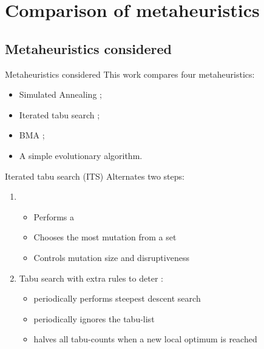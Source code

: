 \section{Comparison of metaheuristics} {
    \subsection{Metaheuristics considered} {
        \begin{frame}{Metaheuristics considered}
            This work compares four metaheuristics:
            \begin{itemize}
                \item Simulated Annealing \citep{kirkpatrick:1983op, vcerny:1985th};
                \item Iterated tabu search \citep{Misevicius:2012dj};
                \item BMA \citep{Benlic:2015gp};
                \item A simple evolutionary algorithm.
            \end{itemize}
        \end{frame}

        \begin{frame}{Iterated tabu search (ITS) \citep{Misevicius:2012dj}}
            Alternates two steps:
            \begin{enumerate}
                \item {}
                    \begin{itemize}
                        \item Performs a 
                        \item Chooses the most  mutation from a set
                        \item Controls mutation size and disruptiveness
                    \end{itemize}
                \item {}
                    Tabu search with extra rules to deter :
                    \begin{itemize}
                        \item periodically performs steepest descent search
                        \item periodically ignores the tabu-list
                        \item halves all tabu-counts when a new local optimum is reached
                    \end{itemize}
            \end{enumerate}
        \end{frame}

}}
